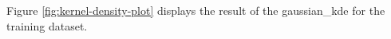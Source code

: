 \documentclass{support/acm_proc_article-sp}
\begin{document}
    Figure \ref{fig:kernel-density-plot} displays the result of the gaussian\_kde for the training dataset.

\end{document}
